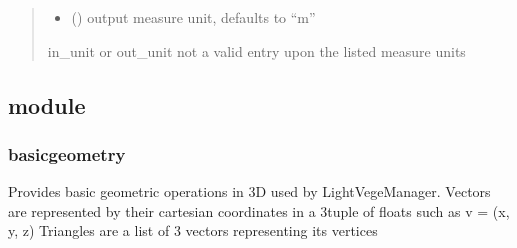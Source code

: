 \documentclass[letterpaper,10pt,english]{sphinxmanual}
\begin{document}
\begin{fulllineitems}
\begin{quote}
\begin{description}
\begin{itemize}
\item {} 
\sphinxAtStartPar
{} (\sphinxstyleliteralemphasis{\sphinxupquote{, }}) \textendash{} output measure unit, defaults to “m”

\end{itemize}

\sphinxAtStartPar
{} \textendash{} in\_unit or out\_unit not a valid entry upon the listed measure units

\end{description}\end{quote}

\end{fulllineitems}



\subsection{ module}
\label{\detokenize{reference:module-basicgeometry}}\label{\detokenize{reference:basicgeometry-module}}

\subsubsection{basicgeometry}
\label{\detokenize{reference:basicgeometry}}
\sphinxAtStartPar
Provides basic geometric operations in 3D used by LightVegeManager. 
Vectors are represented by their cartesian coordinates in a 3\sphinxhyphen{}tuple of floats such as v = (x, y, z)
Triangles are a list of 3 vectors representing its vertices
\end{document}
